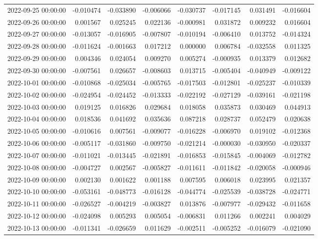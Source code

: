 \begin{tabular}{lrrrrrrr}
2022-09-25 00:00:00 & -0.010474 & -0.033890 & -0.006066 & -0.030737 & -0.017145 & 0.031491 & -0.016604 \\
2022-09-26 00:00:00 & 0.001567 & 0.025245 & 0.022136 & -0.000981 & 0.031872 & 0.009232 & 0.016604 \\
2022-09-27 00:00:00 & -0.013057 & -0.016905 & -0.007807 & -0.010194 & -0.006410 & 0.013752 & -0.014324 \\
2022-09-28 00:00:00 & -0.011624 & -0.001663 & 0.017212 & 0.000000 & 0.006784 & -0.032558 & 0.011325 \\
2022-09-29 00:00:00 & 0.004346 & 0.024054 & 0.009270 & 0.005274 & -0.000935 & 0.013379 & 0.012682 \\
2022-09-30 00:00:00 & -0.007561 & 0.026657 & -0.008603 & 0.013715 & -0.005404 & -0.040949 & -0.009122 \\
2022-10-01 00:00:00 & -0.010868 & -0.025034 & -0.005765 & -0.017503 & -0.012801 & -0.025237 & -0.010339 \\
2022-10-02 00:00:00 & -0.024954 & -0.024452 & -0.013333 & -0.022192 & -0.027129 & -0.039161 & -0.021198 \\
2022-10-03 00:00:00 & 0.019125 & 0.016826 & 0.029684 & 0.018058 & 0.035873 & 0.030469 & 0.044913 \\
2022-10-04 00:00:00 & 0.018536 & 0.041692 & 0.035636 & 0.087218 & 0.028737 & 0.052479 & 0.020638 \\
2022-10-05 00:00:00 & -0.010616 & 0.007561 & -0.009077 & -0.016228 & -0.006970 & 0.019102 & -0.012368 \\
2022-10-06 00:00:00 & -0.005117 & -0.031860 & -0.009750 & -0.021214 & -0.000030 & -0.030950 & -0.020337 \\
2022-10-07 00:00:00 & -0.011021 & -0.013445 & -0.021891 & -0.016853 & -0.015845 & -0.004069 & -0.012782 \\
2022-10-08 00:00:00 & -0.004727 & 0.002567 & -0.005827 & -0.011611 & -0.011842 & -0.020058 & -0.000946 \\
2022-10-09 00:00:00 & 0.002130 & 0.001622 & 0.001188 & 0.007595 & 0.006018 & 0.023995 & 0.021357 \\
2022-10-10 00:00:00 & -0.053161 & -0.048773 & -0.016128 & -0.044774 & -0.025539 & -0.038728 & -0.024771 \\
2022-10-11 00:00:00 & -0.026527 & -0.004219 & -0.003827 & 0.013876 & -0.007977 & -0.029432 & -0.011658 \\
2022-10-12 00:00:00 & -0.024098 & 0.005293 & 0.005054 & -0.006831 & 0.011266 & 0.002241 & 0.004029 \\
2022-10-13 00:00:00 & -0.011341 & -0.026659 & 0.011629 & -0.002511 & -0.005252 & -0.016079 & -0.021090 \\

\end{tabular}
